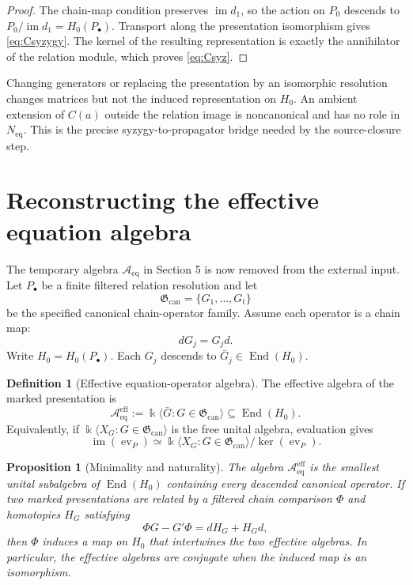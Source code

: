 \documentclass[11pt]{article}
\newtheorem{proposition}[theorem]{Proposition}
\theoremstyle{definition}
\newtheorem{definition}[theorem]{Definition}
\newcommand{\kk}{\Bbbk}
\newcommand{\im}{\operatorname{im}}
\newcommand{\End}{\operatorname{End}}
\newcommand{\Aeff}{\mathscr A_{\mathrm{eq}}^{\mathrm{eff}}}
\newcommand{\Aeq}{\mathscr A_{\mathrm{eq}}}
\newcommand{\Neq}{N_{\mathrm{eq}}}
\newcommand{\Gcan}{\mathfrak G_{\mathrm{can}}}
\begin{document}
\begin{proof}
The chain-map condition preserves \(\im d_1\), so the action on \(P_0\) descends to
\(P_0/\im d_1=H_0(P_\bullet)\). Transport along the presentation isomorphism gives
\eqref{eq:Csyzygy}. The kernel of the resulting representation is exactly the annihilator of the
relation module, which proves \eqref{eq:Csyz}.
\end{proof}

Changing generators or replacing the presentation by an isomorphic resolution changes matrices but
not the induced representation on \(H_0\). An ambient extension of \(C(a)\) outside the relation
image is noncanonical and has no role in \(\Neq\). This is the precise syzygy-to-propagator bridge
needed by the source-closure step.

\section{Reconstructing the effective equation algebra}

The temporary algebra \(\Aeq\) in Section 5 is now removed from the external input. Let
\(P_\bullet\) be a finite filtered relation resolution and let
\[
\Gcan=\{G_1,\ldots,G_t\}
\]
be the specified canonical chain-operator family. Assume each operator is a chain map:
\[
dG_j=G_jd.
\]
Write \(H_0=H_0(P_\bullet)\). Each \(G_j\) descends to \(\bar G_j\in\End(H_0)\).

\begin{definition}[Effective equation-operator algebra]
The effective algebra of the marked presentation is
\begin{equation}
\Aeff:=\kk\langle\bar G:G\in\Gcan\rangle
\subseteq\End(H_0).
\label{eq:Aeff}
\end{equation}
Equivalently, if \(\kk\langle X_G:G\in\Gcan\rangle\) is the free unital algebra, evaluation gives
\begin{equation}
\im(\operatorname{ev}_P)
\simeq
\kk\langle X_G:G\in\Gcan\rangle/\ker(\operatorname{ev}_P).
\label{eq:freeeval}
\end{equation}
\end{definition}

\begin{proposition}[Minimality and naturality]
The algebra \(\Aeff\) is the smallest unital subalgebra of \(\End(H_0)\) containing every descended
canonical operator. If two marked presentations are related by a filtered chain comparison \(\Phi\)
and homotopies \(H_G\) satisfying
\[
\Phi G-G'\Phi=dH_G+H_Gd,
\]
then \(\Phi\) induces a map on \(H_0\) that intertwines the two effective algebras. In particular,
the effective algebras are conjugate when the induced map is an isomorphism.
\end{proposition}
\end{document}
